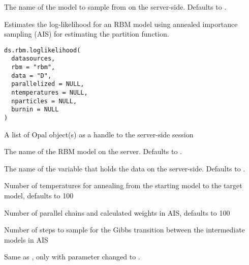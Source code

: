 %
\begin{Arguments}
\begin{ldescription}
\item[\code{rbm}] The name of the model to sample from on the server-side. Defaults to .
\end{ldescription}
\end{Arguments}
%
\begin{Description}\relax
Estimates the log-likelihood for an RBM model using annealed importance sampling (AIS)
for estimating the partition function.
\end{Description}
%
\begin{Usage}
\begin{verbatim}
ds.rbm.loglikelihood(
  datasources,
  rbm = "rbm",
  data = "D",
  parallelized = NULL,
  ntemperatures = NULL,
  nparticles = NULL,
  burnin = NULL
)
\end{verbatim}
\end{Usage}
%
\begin{Arguments}
\begin{ldescription}
\item[\code{datasources}] A list of Opal object(s) as a handle to the server-side session

\item[\code{rbm}] The name of the RBM model on the server. Defaults to .

\item[\code{data}] The name of the variable that holds the data on the server-side.
Defaults to .

\item[\code{ntemperatures}] Number of temperatures for annealing from the starting model
to the target model, defaults to 100

\item[\code{nparticles}] Number of parallel chains and calculated weights in AIS, defaults to 100

\item[\code{burnin}] Number of steps to sample for the Gibbs transition between the intermediate models in AIS
\end{ldescription}
\end{Arguments}
%
\begin{Description}\relax
Same as , only with parameter  changed to .
\end{Description}
